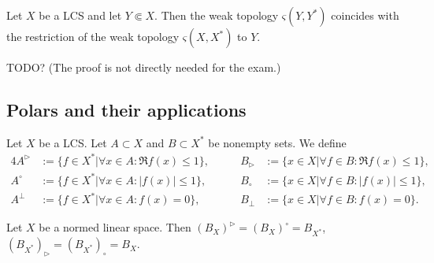 \documentclass[12pt]{article}					%
\begin{document}
\begin{tvrzeni}
	Let $X$ be a LCS and let $Y \Subset X$. Then the weak topology $ς(Y, Y^*)$ coincides with the restriction of the weak topology $ς(X, X^*)$ to $Y$.

	\begin{dukazin}
		TODO? (The proof is not directly needed for the exam.)
	\end{dukazin}
\end{tvrzeni}

\subsection{Polars and their applications}
\begin{definice}
	Let $X$ be a LCS. Let $A \subset X$ and $B \subset X^*$ be nonempty sets. We define
	\begin{alignat*}{4}
		A^\triangleright &:= \{f \in X^* | \forall x \in A: \Re f(x) ≤ 1\}, \qquad & B_\triangleright &:= \{x \in X | \forall f \in B: \Re f(x) ≤ 1\},\\
		A^∘ &:= \{f \in X^* | \forall x \in A: |f(x)| ≤ 1\}, \qquad & B_∘ &:= \{x \in X | \forall f \in B: |f(x)| ≤ 1\},\\
		A^\perp &:= \{f \in X^* | \forall x \in A: f(x) = 0\}, \qquad & B_\perp &:= \{x \in X | \forall f \in B: f(x) = 0\}.
	\end{alignat*}
\end{definice}

\begin{priklad}
	Let $X$ be a normed linear space. Then $(B_X)^\triangleright = (B_X)^∘ = B_{X^*}$, $(B_{X^*})_\triangleright = (B_{X^*})_∘ = B_X$.
\end{priklad}
\end{document}
